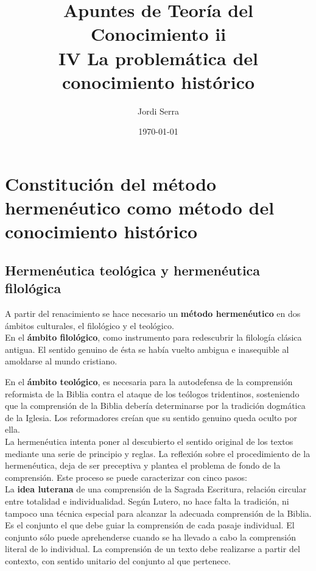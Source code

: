 \documentclass[a4paper, 11pt, twocolumn, spanish]{article}
\author{Jordi Serra}
\date{\today}
\title{Apuntes de Teoría del Conocimiento ii\\\medskip
\large IV La problemática del conocimiento histórico}
\begin{document}
\maketitle
\tableofcontents


\section{Constitución del método hermenéutico como método del conocimiento histórico}
\label{sec:org98fe4ac}
\subsection{Hermenéutica teológica y hermenéutica filológica}
\label{sec:orgeddc68b}

A partir del renacimiento se hace necesario un \textbf{método hermenéutico}
en dos ámbitos culturales, el filológico y el teológico.\\[0pt]

En el \textbf{ámbito filológico}, como instrumento para redescubrir la
filología clásica antigua. El sentido genuino de ésta se había vuelto
ambigua e inasequible al amoldarse al mundo cristiano.

En el \textbf{ámbito teológico}, es necesaria para la autodefensa de la
comprensión reformista de la Biblia contra el ataque de los teólogos
tridentinos, sosteniendo que la comprensión de la Biblia debería
determinarse por la tradición dogmática de la Iglesia. Los
reformadores creían que su sentido genuino queda oculto por ella.\\[0pt]

La hermenéutica intenta poner al descubierto el sentido original de
los textos mediante una serie de principio y reglas. La reflexión
sobre el procedimiento de la hermenéutica, deja de ser preceptiva y
plantea el problema de fondo de la comprensión. Este proceso se puede
caracterizar con cinco pasos:\\[0pt]

La \textbf{idea luterana} de una comprensión de la Sagrada Escritura, relación
circular entre totalidad e individualidad. Según Lutero, no hace falta
la tradición, ni tampoco una técnica especial para alcanzar la
adecuada comprensión de la Biblia. Es el conjunto el que debe guiar la
comprensión de cada pasaje individual. El conjunto sólo puede
aprehenderse cuando se ha llevado a cabo la comprensión literal de lo
individual. La comprensión de un texto debe realizarse a partir del
contexto, con sentido unitario del conjunto al que pertenece.\\[0pt]
\end{document}
